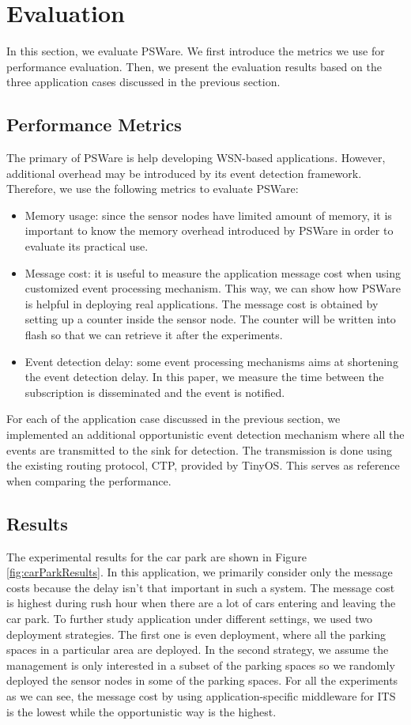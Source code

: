 \section{Evaluation}
\label{sec:experiments}
In this section, we evaluate PSWare. We first introduce the metrics we use for performance evaluation. Then, we present the evaluation results based on the three application cases discussed in the previous section. 

\subsection{Performance Metrics}
The primary of PSWare is help developing WSN-based applications. However, additional overhead may be introduced by its event detection framework. Therefore, we use the following metrics to evaluate PSWare:
\begin{itemize}
\item Memory usage: since the sensor nodes have limited amount of memory, it is important to know the memory overhead introduced by PSWare in order to evaluate its practical use. 
\item Message cost: it is useful to measure the application message cost when using customized event processing mechanism. This way, we can show how PSWare is helpful in deploying real applications. The message cost is obtained by setting up a counter inside the sensor node. The counter will be written into flash so that we can retrieve it after the experiments.
\item Event detection delay: some event processing mechanisms aims at shortening the event detection delay. In this paper, we measure the time between the subscription is disseminated and the event is notified.
\end{itemize}

For each of the application case discussed in the previous section, we implemented an additional opportunistic event detection mechanism where all the events are transmitted to the sink for detection. The transmission is done using the existing routing protocol, CTP, provided by TinyOS. This serves as reference when comparing the performance.

\subsection{Results}
The experimental results for the car park are shown in Figure \ref{fig:carParkResults}. In this application, we primarily consider only the message costs because the delay isn't that important in such a system. The message cost is highest during rush hour when there are a lot of cars entering and leaving the car park. To further study application under different settings, we used two deployment strategies. The first one is even deployment, where all the parking spaces in a particular area are deployed. In the second strategy, we assume the management is only interested in a subset of the parking spaces so we randomly deployed the sensor nodes in some of the parking spaces. For all the experiments as we can see, the message cost by using application-specific middleware for ITS is the lowest while the opportunistic way is the highest.

